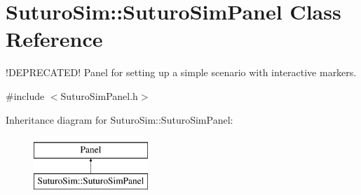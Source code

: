 \hypertarget{classSuturoSim_1_1SuturoSimPanel}{\section{Suturo\-Sim\-:\-:Suturo\-Sim\-Panel Class Reference}
\label{classSuturoSim_1_1SuturoSimPanel}
}


!\-D\-E\-P\-R\-E\-C\-A\-T\-E\-D! Panel for setting up a simple scenario with interactive markers.  




{\ttfamily \#include $<$Suturo\-Sim\-Panel.\-h$>$}

Inheritance diagram for Suturo\-Sim\-:\-:Suturo\-Sim\-Panel\-:\begin{figure}[H]
\begin{center}
\leavevmode
\includegraphics[height=2.000000cm]{classSuturoSim_1_1SuturoSimPanel}
\end{center}
\end{figure}
